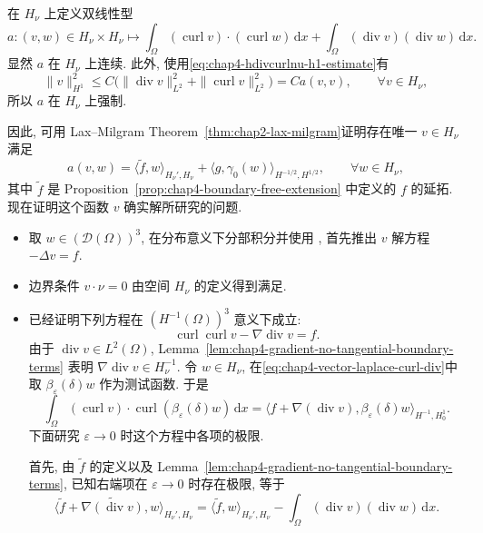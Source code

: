 \begin{Proof}
在 $H_\nu$ 上定义双线性型
\[
 a:(v,w)\in H_\nu\times H_\nu\longmapsto
 \int_\Omega(\operatorname{curl}v)\cdot(\operatorname{curl}w)\,\mathrm dx
 +\int_\Omega(\operatorname{div}v)(\operatorname{div}w)\,\mathrm dx.
\]
显然 $a$ 在 $H_\nu$ 上连续. 此外, 使用\eqref{eq:chap4-hdivcurlnu-h1-estimate}有
\[
 \|v\|_{H^1}^2
 \leq C\bigl(\|\operatorname{div}v\|_{L^2}^2+\|\operatorname{curl}v\|_{L^2}^2\bigr)
 =Ca(v,v),
 \qquad\forall v\in H_\nu,
\]
所以 $a$ 在 $H_\nu$ 上强制.

因此, 可用 Lax--Milgram Theorem~\ref{thm:chap2-lax-milgram}证明存在唯一 $v\in H_\nu$ 满足
\begin{equation}
 a(v,w)=\langle\widetilde f,w\rangle_{H_\nu',H_\nu}
 +\langle g,\gamma_0(w)\rangle_{H^{-1/2},H^{1/2}},
 \qquad\forall w\in H_\nu,
 \label{eq:chap4-vector-laplace-vorticity-variational}
\end{equation}
其中 $\widetilde f$ 是 Proposition~\ref{prop:chap4-boundary-free-extension} 中定义的 $f$ 的延拓. 现在证明这个函数 $v$ 确实解所研究的问题.

\begin{itemize}
\item 取 $w\in(\mathcal D(\Omega))^3$, 在分布意义下分部积分并使用 , 首先推出 $v$ 解方程 $-\Delta v=f$.

\item 边界条件 $v\cdot\nu=0$ 由空间 $H_\nu$ 的定义得到满足.

\item 已经证明下列方程在 $(H^{-1}(\Omega))^3$ 意义下成立:
\begin{equation}
 \operatorname{curl}\operatorname{curl}v-\nabla\operatorname{div}v=f.
 \label{eq:chap4-vector-laplace-curl-div}
\end{equation}
由于 $\operatorname{div}v\in L^2(\Omega)$, Lemma~\ref{lem:chap4-gradient-no-tangential-boundary-terms} 表明 $\nabla\operatorname{div}v\in H_\nu^{-1}$. 令 $w\in H_\nu$, 在\eqref{eq:chap4-vector-laplace-curl-div}中取 $\beta_\varepsilon(\delta)w$ 作为测试函数. 于是
\begin{equation}
 \int_\Omega(\operatorname{curl}v)\cdot\operatorname{curl}(\beta_\varepsilon(\delta)w)\,\mathrm dx
 =\langle f+\nabla(\operatorname{div}v),\beta_\varepsilon(\delta)w\rangle_{H^{-1},H_0^1}.
 \label{eq:chap4-vorticity-cutoff-identity}
\end{equation}
下面研究 $\varepsilon\to0$ 时这个方程中各项的极限.

首先, 由 $\widetilde f$ 的定义以及 Lemma~\ref{lem:chap4-gradient-no-tangential-boundary-terms}, 已知右端项在 $\varepsilon\to0$ 时存在极限, 等于
\[
 \langle\widetilde f+\widetilde{\nabla(\operatorname{div}v)},w\rangle_{H_\nu',H_\nu}
 =\langle\widetilde f,w\rangle_{H_\nu',H_\nu}
 -\int_\Omega(\operatorname{div}v)(\operatorname{div}w)\,\mathrm dx.
\]


\end{itemize}
\end{Proof}
